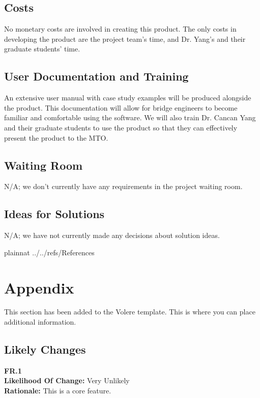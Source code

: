 \documentclass[12pt]{article}
\begin{document}
\subsection{Costs}

No monetary costs are involved in creating this product. The only costs in developing the product are the project team's time, and Dr. Yang's and their graduate students' time.

\subsection{User Documentation and Training}

An extensive user manual with case study examples will be produced alongside the product. This documentation will allow for bridge engineers to become 
familiar and comfortable using the software. We will also train Dr. Cancan Yang and their graduate students to use the product so that they can effectively present the 
product to the MTO.

\subsection{Waiting Room}

N/A; we don't currently have any requirements in the project waiting room.

\subsection{Ideas for Solutions}

N/A; we have not currently made any decisions about solution ideas.

\newpage

 {plainnat}
 {../../refs/References}

\newpage

\section{Appendix}

This section has been added to the Volere template.  This is where you can place
additional information.

\subsection{Likely Changes}

  \textbf{FR.1}\\  
  \textbf{Likelihood Of Change:} Very Unlikely\\ 
  \textbf{Rationale:} This is a core feature.\\\\
\end{document}

